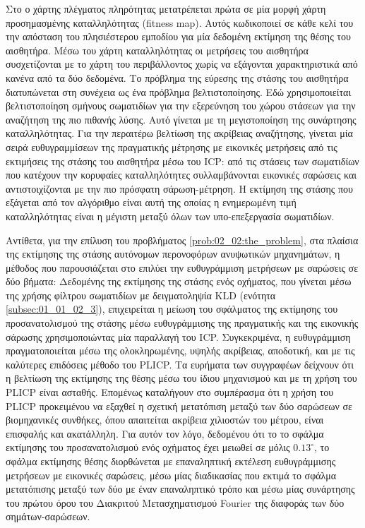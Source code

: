 Στο \cite{Zhang2017a} ο χάρτης πλέγματος πληρότητας μετατρέπεται πρώτα σε μία
μορφή χάρτη προσημασμένης καταλληλότητας (fitness map). Αυτός κωδικοποιεί σε
κάθε κελί του την απόσταση του πλησιέστερου εμποδίου για μία δεδομένη εκτίμηση
της θέσης του αισθητήρα. Μέσω του χάρτη καταλληλότητας οι μετρήσεις του
αισθητήρα συσχετίζονται με το χάρτη του περιβάλλοντος χωρίς να εξάγονται
χαρακτηριστικά από κανένα από τα δύο δεδομένα. Το πρόβλημα της εύρεσης της
στάσης του αισθητήρα διατυπώνεται στη συνέχεια ως ένα πρόβλημα βελτιστοποίησης.
Εδώ χρησιμοποιείται βελτιστοποίηση σμήνους σωματιδίων για την εξερεύνηση του
χώρου στάσεων για την αναζήτηση της πιο πιθανής λύσης. Αυτό γίνεται με τη
μεγιστοποίηση της συνάρτησης καταλληλότητας. Για την περαιτέρω βελτίωση της
ακρίβειας αναζήτησης, γίνεται μία σειρά ευθυγραμμίσεων της πραγματικής μέτρησης
με εικονικές μετρήσεις από τις εκτιμήσεις της στάσης του αισθητήρα μέσω του
ICP: από τις στάσεις των σωματιδίων που κατέχουν την κορυφαίες καταλληλότητες
συλλαμβάνονται εικονικές σαρώσεις και αντιστοιχίζονται με την πιο πρόσφατη
σάρωση-μέτρηση. Η εκτίμηση της στάσης που εξάγεται από τον αλγόριθμο είναι
αυτή της οποίας η ενημερωμένη τιμή καταλληλότητας είναι η μέγιστη μεταξύ όλων
των υπο-επεξεργασία σωματιδίων.

Αντίθετα, για την επίλυση του προβλήματος \ref{prob:02_02:the_problem}, στα
πλαίσια της εκτίμησης της στάσης αυτόνομων περονοφόρων ανυψωτικών μηχανημάτων,
η μέθοδος που παρουσιάζεται στο \cite{Vasiljevic2016a} επιλύει την ευθυγράμμιση
μετρήσεων με σαρώσεις σε δύο βήματα: Δεδομένης της εκτίμησης της στάσης ενός
οχήματος, που γίνεται μέσω της χρήσης φίλτρου σωματιδίων με δειγματοληψία KLD
(ενότητα \ref{subsec:01_01_02_3}), επιχειρείται η μείωση του σφάλματος της
εκτίμησης του προσανατολισμού της στάσης μέσω ευθυγράμμισης της πραγματικής και
της εικονικής σάρωσης χρησιμοποιώντας μία παραλλαγή του ICP. Συγκεκριμένα, η
ευθυγράμμιση πραγματοποιείται μέσω της ολοκληρωμένης, υψηλής ακρίβειας,
αποδοτική, και με τις καλύτερες επιδόσεις μέθοδο του PLICP.  Τα ευρήματα των
συγγραφέων δείχνουν ότι η βελτίωση της εκτίμησης της θέσης μέσω του ίδιου
μηχανισμού και με τη χρήση του PLICP είναι ασταθής. Επομένως καταλήγουν στο
συμπέρασμα ότι η χρήση του PLICP προκειμένου να εξαχθεί η σχετική μετατόπιση
μεταξύ των δύο σαρώσεων σε βιομηχανικές συνθήκες, όπου απαιτείται ακρίβεια
χιλιοστών του μέτρου,  είναι επισφαλής και ακατάλληλη. Για αυτόν τον λόγο,
δεδομένου ότι το το σφάλμα εκτίμησης του προσανατολισμού ενός οχήματος έχει
μειωθεί σε μόλις $0.13^\circ$, το σφάλμα εκτίμησης θέσης διορθώνεται με
επαναληπτική εκτέλεση ευθυγράμμισης μετρήσεων με εικονικές σαρώσεις, μέσω μίας
διαδικασίας που εκτιμά το σφάλμα μετατόπισης μεταξύ των δύο με έναν
επαναληπτικό τρόπο και μέσω μίας συνάρτησης του πρώτου όρου του Διακριτού
Μετασχηματισμού Fourier της διαφοράς των δύο σημάτων-σαρώσεων.

